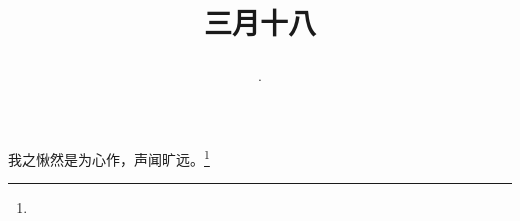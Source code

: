 \title{\date[d=26,m=4,y=2024][year:cn-y,年,month:cn,day:cn,日,·,weekday]·三月十八 }
我之愀然是为心作，声闻旷远。\footnote{ }

